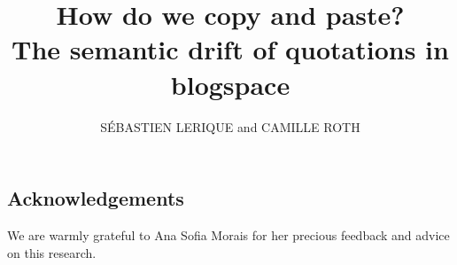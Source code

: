 \documentclass{acmtog}
\title{{How do we copy and paste?\\The semantic drift of quotations in blogspace}}
\date{}
\author{S\'EBASTIEN LERIQUE {\upshape and} CAMILLE ROTH}
\begin{document}
\maketitle











\subsection*{Acknowledgements}

We are warmly grateful to Ana Sofia Morais for her precious feedback and advice on this research.



\end{document}
